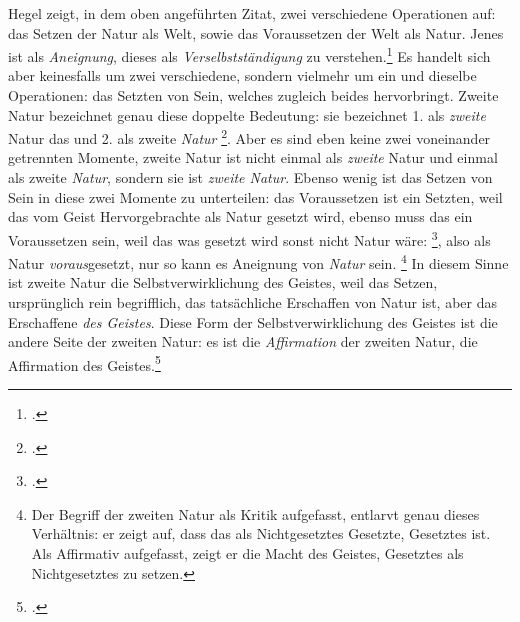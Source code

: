 \documentclass[12pt, a4paper, openany]{report}
\begin{document}
Hegel zeigt, in dem oben angeführten Zitat, zwei verschiedene Operationen auf: 
das Setzen der Natur als Welt, sowie das Voraussetzen der Welt als Natur.
Jenes ist als \emph{Aneignung}, dieses als \emph{Verselbstständigung} zu verstehen.\footcite[Vgl][141]{menke_autonomie_2018}
Es handelt sich aber keinesfalls um zwei verschiedene, sondern vielmehr um ein und dieselbe Operationen: 
das Setzten von Sein, welches zugleich beides hervorbringt.
Zweite Natur bezeichnet genau diese doppelte Bedeutung: 
sie bezeichnet 1. als \emph{zweite} Natur das  und 2. als zweite \emph{Natur} \footcite[][142]{menke_autonomie_2018}.
Aber es sind eben keine zwei voneinander getrennten Momente, zweite Natur ist nicht einmal als \emph{zweite} Natur und einmal als zweite \emph{Natur}, sondern sie ist \emph{zweite Natur}.
Ebenso wenig ist das Setzen von Sein in diese zwei Momente zu unterteilen:
das Voraussetzen ist ein Setzten, weil das vom Geist Hervorgebrachte als Natur gesetzt wird,
ebenso muss das  ein Voraussetzen sein, weil das was gesetzt wird sonst nicht Natur wäre: 
\footcite[][142]{menke_autonomie_2018}, also als Natur \emph{voraus}gesetzt, nur so kann es Aneignung von \emph{Natur} sein.%
\footnote{
    Der Begriff der zweiten Natur als Kritik aufgefasst, entlarvt genau dieses Verhältnis: er zeigt auf, dass das als Nichtgesetztes Gesetzte, Gesetztes ist.
    Als Affirmativ aufgefasst, zeigt er die Macht des Geistes, Gesetztes als Nichtgesetztes zu setzen.
}
In diesem Sinne ist zweite Natur die Selbstverwirklichung des Geistes, weil das Setzen, ursprünglich rein begrifflich, das tatsächliche Erschaffen von Natur ist, aber das Erschaffene \emph{des Geistes}.
Diese Form der Selbstverwirklichung des Geistes ist die andere Seite der zweiten Natur: es ist die \emph{Affirmation} der zweiten Natur, die Affirmation des Geistes.\footcite[Vgl.][143]{menke_autonomie_2018}\\
\end{document}
